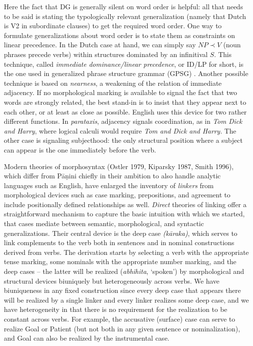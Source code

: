 Here the fact that DG is generally silent on word order is helpful: all that 
needs to be said is stating the typologically relevant generalization (namely
that Dutch is V2 in subordinate clauses) to get the required word order. One
way to formulate generalizations about word order is to state them as
constraints on linear precedence. In the Dutch case at hand, we can simply say
$NP \prec V$ (noun phrases precede verbs) within structures dominated by an
infinitival $S$. This technique, called {\it immediate dominance/linear
precedence}, or ID/LP for short, 
is the one used in generalized phrase structure grammar (GPSG)
 \cite{Gazdar:1985}. Another
possible technique is based on {\it nearness}, a weakening of the relation of
immediate adjacency.  If no morphological marking is available to signal the
fact that two words are strongly related, the best stand-in is to insist that
they appear next to each other, or at least as close as possible.  English
uses this device for two rather different functions. In {\it parataxis},
adjacency signals coordination, as in {\it Tom Dick and Harry}, where logical
calculi would require {\it Tom and Dick and Harry.}  The
other case is signaling subjecthood: the only structural position where a
subject can appear is the one immediately before the verb.

Modern theories of morphosyntax (Ostler 1979, Kiparsky 1987, Smith 1996),
which differ from P\={a}\d{n}ini chiefly in their ambition to also handle
analytic languages such as English, have enlarged the inventory of {\it
  linkers} from morphological devices such as case marking, prepositions, and
agreement to include positionally defined relationships as well.  {\it Direct}
theories of linking offer a straightforward mechanism to capture the basic
intuition with which we started, that cases mediate between semantic,
morphological, and syntactic generalizations. Their central device is the deep
case {\it (k\={a}raka)}, which serves to link complements to the verb both in
sentences and in nominal constructions derived from verbs. The derivation
starts by selecting a verb with the appropriate tense marking, some nominals
with the appropriate number marking, and the deep cases -- the latter will be
realized ({\it abhihita}, `spoken') by morphological and structural devices
biuniquely but heterogeneously across verbs. We have biuniqueness in any fixed
construction since every deep case that appears there will be realized by a
single linker and every linker realizes some deep case, and we have
heterogeneity in that there is no requirement for the realization to be
constant across verbs. For example, the accusative (surface) case can serve to
realize Goal or Patient (but not both in any given sentence or
nominalization), and Goal can also be realized by the instrumental case.

